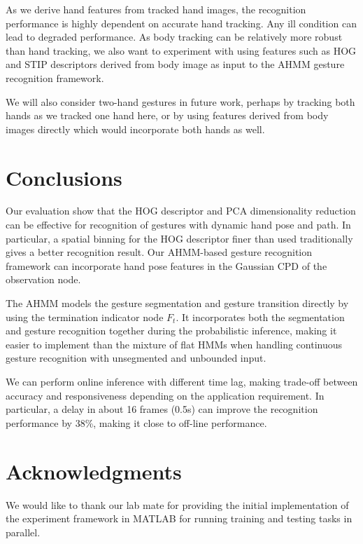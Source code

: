 \documentclass{acm_proc_article-sp}
\begin{document}
As we derive hand features from tracked hand images, the recognition performance is
highly dependent on accurate hand tracking. Any ill condition can lead to degraded performance. 
As body tracking can be relatively more robust than hand tracking, we also want to experiment with
using features such as HOG and STIP descriptors derived from body image as input to
the AHMM gesture recognition framework. 

We will also consider two-hand gestures in future work, perhaps by tracking both hands
as we tracked one hand here, or by using features derived from body images directly which would incorporate both hands as well. 

\section{Conclusions}
Our evaluation show that the HOG descriptor and PCA dimensionality reduction
can be effective for recognition of gestures with dynamic hand pose and path. In particular, 
a spatial binning for the HOG descriptor finer than used traditionally gives a better recognition result. 
Our AHMM-based gesture recognition framework can incorporate hand pose features in the Gaussian CPD of
the observation node. 

The AHMM models the gesture segmentation and gesture transition directly by using the termination
indicator node $F_t$. It incorporates both the segmentation and gesture recognition together
during the probabilistic inference, making it easier to implement than the mixture of flat HMMs when handling
continuous gesture recognition with unsegmented and unbounded input.  

We can perform online inference with different time lag, making trade-off between accuracy and responsiveness depending on the 
application requirement. In particular, a delay in about 16 frames (0.5s) can improve the recognition performance by
38\%, making it close to off-line performance.
 

\section{Acknowledgments}
We would like to thank our lab mate for providing the initial implementation of 
the experiment framework in MATLAB for running training and testing tasks in parallel.


%

\balancecolumns %
\end{document}
